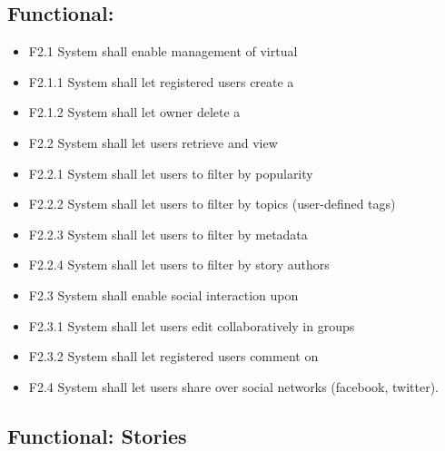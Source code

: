 \documentclass[11pt]{book}
\begin{document}
\subsection{Functional: \wallentitypcap}\label{functional-walls}

\begin{itemize}
  \item F2.1 System shall enable management of virtual \wallentityp
  \item F2.1.1 System shall let registered users create a \wallentitys
  \item F2.1.2 System shall let owner delete a \wallentitys
  \item F2.2 System shall let users retrieve and view \wallentityp
  \item F2.2.1 System shall let users to filter \wallentityp by popularity
  \item F2.2.2 System shall let users to filter \wallentityp by topics (user-defined tags)
  \item F2.2.3 System shall let users to filter \wallentityp by metadata
  \item F2.2.4 System shall let users to filter \wallentityp by story authors
  \item F2.3 System shall enable social interaction upon \wallentityp
  \item F2.3.1 System shall let users edit \wallentityp collaboratively in groups
  \item F2.3.2 System shall let registered users comment on \wallentityp
  \item F2.4 System shall let users share \wallentitys over social networks (facebook, twitter).
\end{itemize}

\subsection{Functional: Stories}\label{functional-stories}
\end{document}
